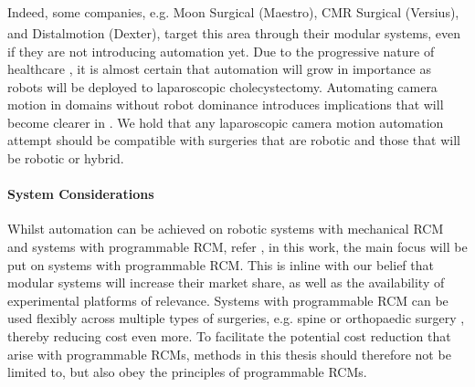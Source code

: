 Indeed, some companies, e.g. Moon Surgical (Maestro\textsuperscript{\textregistered}), CMR Surgical (Versius\textsuperscript{\textregistered}), and Distalmotion (Dexter\textsuperscript{\textregistered}), target this area through their modular systems, even if they are not introducing automation yet. Due to the progressive nature of healthcare \cite{chatterjee2024advancements}, it is almost certain that automation will grow in importance as robots will be deployed to laparoscopic cholecystectomy. Automating camera motion in domains without robot dominance introduces implications that will become clearer in . We hold that any laparoscopic camera motion automation attempt should be compatible with surgeries that are robotic and those that will be robotic or hybrid.






\paragraph{System Considerations} Whilst automation can be achieved on robotic systems with mechanical RCM and systems with programmable RCM, refer , in this work, the main focus will be put on systems with programmable RCM. This is inline with our belief that modular systems will increase their market share, as well as the availability of experimental platforms of relevance. Systems with programmable RCM can be used flexibly across multiple types of surgeries, e.g. spine \cite{farber2021robotics} or orthopaedic surgery \cite{suarez2023revolutionizing}, thereby reducing cost even more. To facilitate the potential cost reduction that arise with programmable RCMs, methods in this thesis should therefore not be limited to, but also obey the principles of programmable RCMs. 






